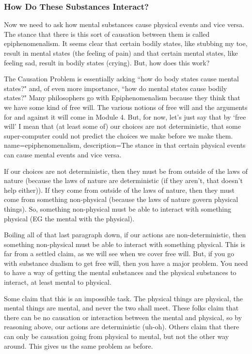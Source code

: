 \subsubsection{How Do These Substances Interact?}

Now we need to ask how mental substances cause physical events and vice versa. The stance that there is this sort of causation between them is called \gls{epiphenomenalism}. It seems clear that certain bodily states, like stubbing my toe, result in mental states (the feeling of pain) and that certain mental states, like feeling sad, result in bodily states (crying). But, how does this work?

The Causation Problem is essentially asking ``how do body states cause mental states?" and, of even more importance, ``how do mental states cause bodily states?" Many philosophers go with Epiphenomenalism because they think that we have some kind of free will. The various notions of free will and the arguments for and against it will come in Module 4. But, for now, let's just say that by `free will' I mean that (at least some of) our choices are not deterministic, that some super-computer could not predict the choices we make before we make them.
{
name=epiphenomenalism,
description={The stance in that certain physical events can cause mental events and vice versa.}
}

If our choices are not deterministic, then they must be from outside of the laws of nature (because the laws of nature are deterministic (if they aren't, that doesn't help either)).  If they come from outside of the laws of nature, then they must come from something non-physical (because the laws of nature govern physical things). So, something non-physical must be able to interact with something physical (EG the mental with the physical).

Boiling all of that last paragraph down, if our actions are non-deterministic, then something non-physical must be able to interact with something physical. This is far from a settled claim, as we will see when we cover free will. But, if you go with substance dualism to get free will, then you have a major problem. You need to have a way of getting the mental substances and the physical substances to interact, at least mental to physical. 

Some claim that this is an impossible task. The physical things are physical, the mental things are mental, and never the two shall meet. These folks claim that there can be no causation or interaction between the mental and physical, so by reasoning above, our actions are deterministic (uh-oh). Others claim that there can only be causation going from physical to mental, but not the other way around. This gives us the same problem as before.

